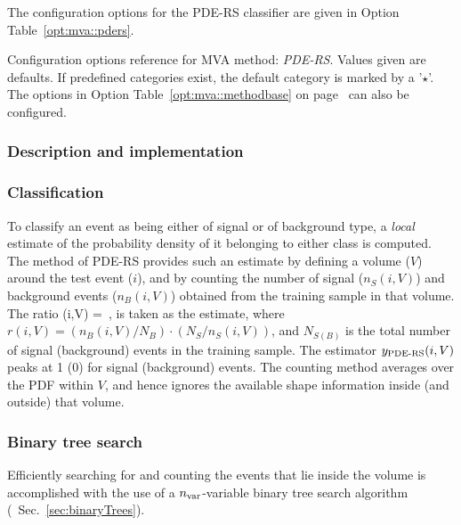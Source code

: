 The configuration options for the PDE-RS classifier are given in 
Option Table~\ref{opt:mva::pders}.

\begin{option}[t]

\caption[.]{\optionCaptionSize 
     Configuration options reference for MVA method: {\em PDE-RS}.
     Values given are defaults. If predefined categories exist, the default category 
     is marked by a '$\star$'. The options in Option Table~\ref{opt:mva::methodbase} on 
     page~\pageref{opt:mva::methodbase} can also be configured.     
}
\label{opt:mva::pders}
\end{option}
\subsubsection{Description and implementation}

\subsubsection*{Classification}

To classify an event as being either of signal or of background type, a {\em local}
estimate of the probability density of it belonging to either class is 
computed. The method of PDE-RS provides such an estimate by defining a 
volume ($V$) around the test event ($i$), and by counting the number of signal 
($n_S(i,V)$) and background events ($n_B(i,V)$) obtained from the training 
sample in that volume. The ratio 
\beq
\label{eq:PDERSratio}
	\RPDERS(i,V) = \,,
\eeq
is taken as the estimate, where $r(i,V)=(n_B(i,V)/N_B)\cdot(N_S/n_S(i,V))$, 
and $N_{S(B)}$ is the total number of signal (background) events in the 
training sample. The estimator $ y_\text{\mbox{PDE-RS}}(i,V)$ peaks at 1 (0) for signal 
(background) events. The counting method averages over the PDF within $V$, 
and hence ignores the available shape information inside (and outside) that 
volume.

\subsubsection*{Binary tree search}

Efficiently searching for and counting the events that lie inside the
volume is accomplished with the use of a ${n_\text{var}}$-variable binary tree 
search algorithm~\cite{BinaryTree} (\cf\  
Sec.~\ref{sec:binaryTrees}).

